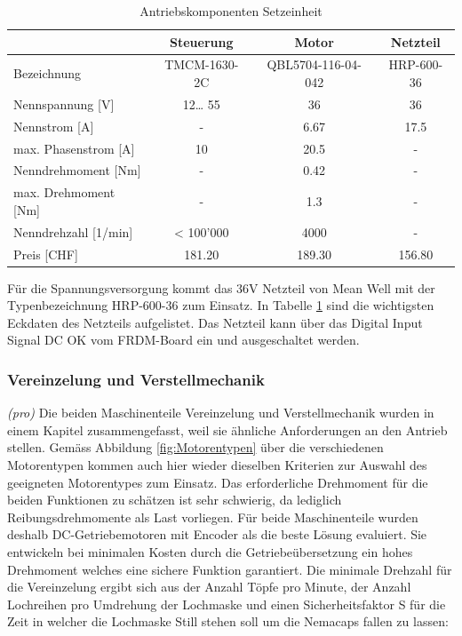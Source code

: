 \begin{table}[H]
	\centering
	\caption{Antriebskomponenten Setzeinheit \protect\cite{Trinamic} \protect\cite{36V_Netzteil}}
	\begin{tabular}{|l|c|c|c|}
		\hline 
		 & \textbf{Steuerung} & \textbf{Motor} & \textbf{Netzteil} \\
		\hline
		Bezeichnung & TMCM-1630-2C & QBL5704-116-04-042 & HRP-600-36 \\
		\hline
		Nennspannung [V] & 12… 55 & 36    & 36 \\
		\hline
		Nennstrom [A] & -     & 6.67  & 17.5 \\
		\hline
		max. Phasenstrom [A] & 10    & 20.5  & - \\
		\hline
		Nenndrehmoment [Nm] & -     & 0.42  & - \\
		\hline
		max. Drehmoment [Nm] & -     & 1.3   & - \\
		\hline
		Nenndrehzahl [1/min] & < 100'000 & 4000  & - \\
		\hline
		Preis [CHF] & 181.20 & 189.30 & 156.80 \\
		\hline
	\end{tabular}
	\label{tab:Trinamic}
\end{table}


Für die Spannungsversorgung kommt das 36V Netzteil von Mean Well mit der Typenbezeichnung HRP-600-36 zum Einsatz. In Tabelle \ref{tab:Trinamic} sind die wichtigsten Eckdaten des Netzteils aufgelistet. Das Netzteil kann über das Digital Input Signal DC OK vom FRDM-Board ein und ausgeschaltet werden.


\subsubsection{Vereinzelung und Verstellmechanik}
\textit{(pro)} Die beiden Maschinenteile Vereinzelung und Verstellmechanik wurden in einem Kapitel zusammengefasst, weil sie ähnliche Anforderungen an den Antrieb stellen. Gemäss Abbildung \ref{fig:Motorentypen} über die verschiedenen Motorentypen kommen auch hier wieder dieselben Kriterien zur Auswahl des geeigneten Motorentypes zum Einsatz. Das erforderliche Drehmoment für die beiden Funktionen zu schätzen ist sehr schwierig, da lediglich Reibungsdrehmomente als Last vorliegen. Für beide Maschinenteile wurden deshalb DC-Getriebemotoren mit Encoder als die beste Lösung evaluiert. Sie entwickeln bei minimalen Kosten durch die Getriebeübersetzung ein hohes Drehmoment welches eine sichere Funktion garantiert. Die minimale Drehzahl für die Vereinzelung ergibt sich aus der Anzahl Töpfe pro Minute, der Anzahl Lochreihen pro Umdrehung der Lochmaske und einen Sicherheitsfaktor S für die Zeit in welcher die Lochmaske Still stehen soll um die Nemacaps fallen zu lassen:

